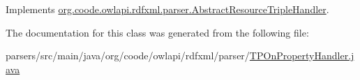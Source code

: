 Implements \hyperlink{classorg_1_1coode_1_1owlapi_1_1rdfxml_1_1parser_1_1_abstract_resource_triple_handler_acfa19ca318d5aaf7fc66e361ba02e7e8}{org.\-coode.\-owlapi.\-rdfxml.\-parser.\-Abstract\-Resource\-Triple\-Handler}.



The documentation for this class was generated from the following file\-:\begin{DoxyCompactItemize}
\item 
parsers/src/main/java/org/coode/owlapi/rdfxml/parser/\hyperlink{_t_p_on_property_handler_8java}{T\-P\-On\-Property\-Handler.\-java}\end{DoxyCompactItemize}
